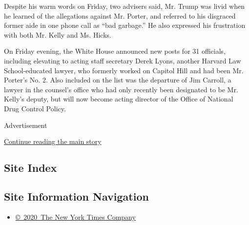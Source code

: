Despite his warm words on Friday, two advisers said, Mr. Trump was livid
when he learned of the allegations against Mr. Porter, and referred to
his disgraced former aide in one phone call as ``bad garbage.'' He also
expressed his frustration with both Mr. Kelly and Ms. Hicks.

On Friday evening, the White House announced new posts for 31 officials,
including elevating to acting staff secretary Derek Lyons, another
Harvard Law School-educated lawyer, who formerly worked on Capitol Hill
and had been Mr. Porter's No. 2. Also included on the list was the
departure of Jim Carroll, a lawyer in the counsel's office who had only
recently been designated to be Mr. Kelly's deputy, but will now become
acting director of the Office of National Drug Control Policy.

Advertisement

\protect\hyperlink{after-bottom}{Continue reading the main story}

\hypertarget{site-index}{%
\subsection{Site Index}\label{site-index}}

\hypertarget{site-information-navigation}{%
\subsection{Site Information
Navigation}\label{site-information-navigation}}

\begin{itemize}
\tightlist
\item
  \href{https://help.nytimes3xbfgragh.onion/hc/en-us/articles/115014792127-Copyright-notice}{©~2020~The
  New York Times Company}
\end{itemize}

